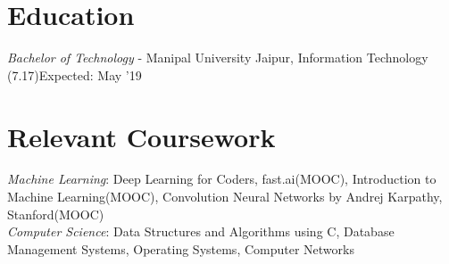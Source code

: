 \documentclass[letter]{res}
\begin{document}
\begin{resume}
   \vspace{-2mm}

\section{Education}
{\sl Bachelor of Technology} - Manipal University Jaipur,  Information Technology (7.17)\hfill Expected: May '19\\
  \vspace{-2mm}

\section{Relevant Coursework}
  {\sl Machine Learning}: Deep Learning for Coders, fast.ai(MOOC), Introduction to Machine Learning(MOOC), Convolution Neural Networks by Andrej Karpathy, Stanford(MOOC)\\
  {\sl Computer Science}: Data Structures and Algorithms using C, Database Management Systems, Operating Systems, Computer Networks


\end{resume}
\end{document}
